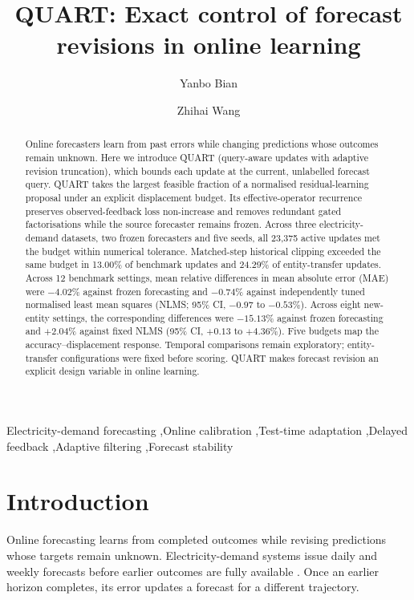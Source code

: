 \documentclass[preprint,12pt,times,nonatbib]{elsarticle}
\begin{document}
\begin{frontmatter}
\title{QUART: Exact control of forecast revisions in online learning}
\author[a]{Yanbo Bian}
\author[b]{Zhihai Wang}
\address[a]{Computer Science and Technology, Weihai International Academy, Beijing Jiaotong University, 69 Xiandai Road, Nanhai New Area, Weihai, Shandong 264401, China.}
\address[b]{School of Computer Science and Technology, Beijing Jiaotong University, 3 Shangyuancun, Haidian District, Beijing 100044, China.}
\begin{abstract}
Online forecasters learn from past errors while changing predictions whose outcomes remain unknown. Here we introduce QUART (query-aware updates with adaptive revision truncation), which bounds each update at the current, unlabelled forecast query. QUART takes the largest feasible fraction of a normalised residual-learning proposal under an explicit displacement budget. Its effective-operator recurrence preserves observed-feedback loss non-increase and removes redundant gated factorisations while the source forecaster remains frozen. Across three electricity-demand datasets, two frozen forecasters and five seeds, all 23,375 active updates met the budget within numerical tolerance. Matched-step historical clipping exceeded the same budget in 13.00\% of benchmark updates and 24.29\% of entity-transfer updates. Across 12 benchmark settings, mean relative differences in mean absolute error (MAE) were $-4.02\%$ against frozen forecasting and $-0.74\%$ against independently tuned normalised least mean squares (NLMS; 95\% CI, $-0.97$ to $-0.53\%$). Across eight new-entity settings, the corresponding differences were $-15.13\%$ against frozen forecasting and $+2.04\%$ against fixed NLMS (95\% CI, $+0.13$ to $+4.36\%$). Five budgets map the accuracy--displacement response. Temporal comparisons remain exploratory; entity-transfer configurations were fixed before scoring. QUART makes forecast revision an explicit design variable in online learning.
\end{abstract}
\begin{keyword}
Electricity-demand forecasting \sep Online calibration \sep Test-time adaptation \sep Delayed feedback \sep Adaptive filtering \sep Forecast stability
\end{keyword}
\end{frontmatter}


\section{Introduction}
Online forecasting learns from completed outcomes while revising predictions whose targets remain unknown. Electricity-demand systems issue daily and weekly forecasts before earlier outcomes are fully available \parencite{baydan2026operational,antoniadis2024hierarchical}. Once an earlier horizon completes, its error updates a forecast for a different trajectory.
\end{document}
